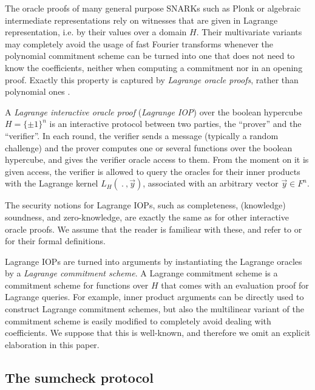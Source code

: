 \documentclass[11pt]{article}
\theoremstyle{definition}
\theoremstyle{remark}
\begin{document}
The oracle proofs of many general purpose SNARKs such as Plonk \cite{Plonk} or algebraic intermediate representations \cite{Starks} rely on witnesses that are given in Lagrange representation, i.e. by their values over a domain $H$.
Their multivariate variants may completely avoid the usage of fast Fourier transforms whenever the polynomial commitment scheme can be turned into one that does not need to know the coefficients, neither when computing a commitment nor in an opening proof.
Exactly this property is captured by \textit{Lagrange oracle proofs}, rather than polynomial ones \cite{Dark}.

A \textit{Lagrange interactive oracle proof} (\textit{Lagrange IOP}) over the boolean hypercube $H=\{\pm 1\}^n$ is an interactive protocol between two parties, the ``prover'' and the ``verifier''.
In each round, the verifier sends a message (typically a random challenge) and the prover computes one or several functions over the boolean hypercube, and gives the verifier oracle access to them.
From the moment on it is given access, the verifier is allowed to query the oracles for their inner products with the Lagrange kernel $L_H(\:.\:, \vec y)$, associated with an arbitrary vector $\vec y\in F^n$. 

The security notions for Lagrange IOPs, such as completeness, (knowledge) soundness, and zero-knowledge, are exactly the same as for other interactive oracle proofs.
We assume that the reader is familiear with these, and refer to \cite{IOPs} or \cite{Dark} for their formal definitions.

Lagrange IOPs are turned into arguments by instantiating the Lagrange oracles by a  \textit{Lagrange commitment scheme}.
A Lagrange commitment scheme is a commitment scheme for functions over $H$ that comes with an evaluation proof for Lagrange queries.
For example, inner product arguments \cite{BootleGroth} can be directly used to construct Lagrange commitment schemes,
but also the multilinear variant \cite{MVKZG} of the \cite{Kate} commitment scheme is easily modified to completely avoid dealing with coefficients. 
We suppose that this is well-known, and therefore we omit an explicit elaboration in this paper.


\subsection{The sumcheck protocol}
\end{document}
